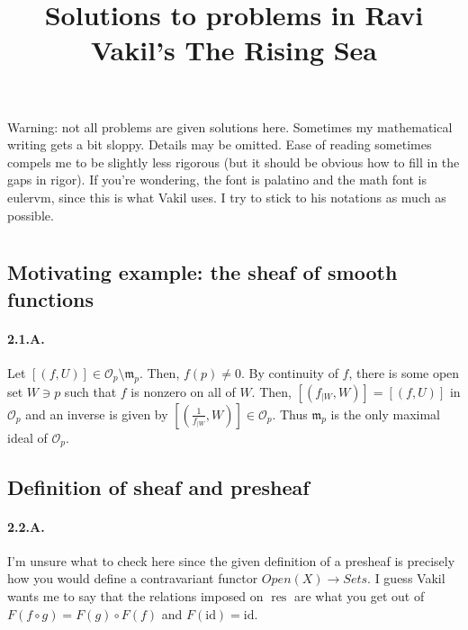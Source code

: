 \documentclass{article}
\title{Solutions to problems in Ravi Vakil's The Rising Sea}
\author{}
\date{}
\newcommand{\id}{\mathrm{id}}
\newcommand{\Set}{\mathit{Sets}}
\DeclareMathOperator{\res}{res}
\newcommand{\Osheaf}{\mathscr{O}}
\newcommand{\m}{\mathfrak{m}}
\begin{document}
\maketitle

Warning: not all problems are given solutions here. Sometimes my mathematical writing gets a bit sloppy. Details may be omitted. Ease of reading sometimes compels me to be slightly less rigorous (but it should be obvious how to fill in the gaps in rigor). If you're wondering, the font is palatino and the math font is eulervm, since this is what Vakil uses. I try to stick to his notations as much as possible.

\setcounter{section}{1}
\section{}

\subsection{Motivating example: the sheaf of smooth functions}

\paragraph{2.1.A.} Let $[(f,U)] \in \Osheaf_p \setminus \m_p$. Then, $f(p) \ne 0$. By continuity of $f$, there is some open set $W \ni p$ such that $f$ is nonzero on all of $W$. Then, $[(f_{\mid W}, W)] = [(f,U)]$ in $\Osheaf_p$ and an inverse is given by $[(\frac{1}{f_{\mid W}}, W)] \in \Osheaf_p$. Thus $\m_p$ is the only maximal ideal of $\Osheaf_p$.

\subsection{Definition of sheaf and presheaf}

\paragraph{2.2.A.} I'm unsure what to check here since the given definition of a presheaf is precisely how you would define a contravariant functor $\mathit{Open}(X) \to \Set$. I guess Vakil wants me to say that the relations imposed on $\res$ are what you get out of $F(f\circ g) = F(g) \circ F(f)$ and $F(\id) = \id$.
\end{document}
